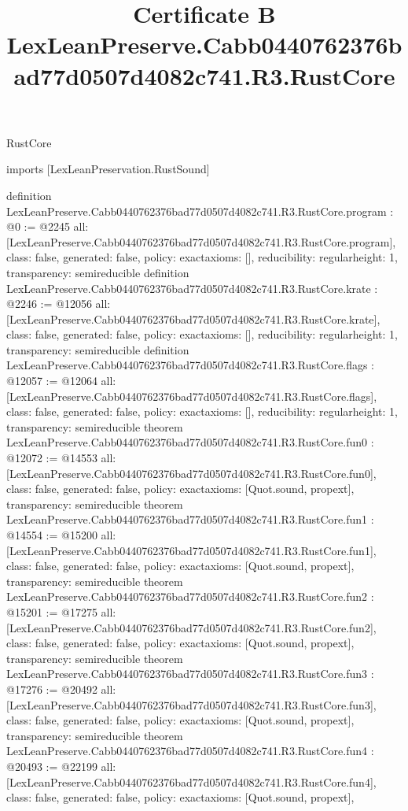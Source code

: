 \begin{lexlean}{RustCore}
\title{Certificate B LexLeanPreserve.Cabb0440762376bad77d0507d4082c741.R3.RustCore}
\begin{coremodule}
imports [LexLeanPreservation.RustSound]

definition LexLeanPreserve.Cabb0440762376bad77d0507d4082c741.R3.RustCore.program : @0 := @2245 {
  all: [LexLeanPreserve.Cabb0440762376bad77d0507d4082c741.R3.RustCore.program],
  class: false,
  generated: false,
  policy: exact{axioms: []},
  reducibility: regular{height: 1},
  transparency: semireducible
}
definition LexLeanPreserve.Cabb0440762376bad77d0507d4082c741.R3.RustCore.krate : @2246 := @12056 {
  all: [LexLeanPreserve.Cabb0440762376bad77d0507d4082c741.R3.RustCore.krate],
  class: false,
  generated: false,
  policy: exact{axioms: []},
  reducibility: regular{height: 1},
  transparency: semireducible
}
definition LexLeanPreserve.Cabb0440762376bad77d0507d4082c741.R3.RustCore.flags : @12057 := @12064 {
  all: [LexLeanPreserve.Cabb0440762376bad77d0507d4082c741.R3.RustCore.flags],
  class: false,
  generated: false,
  policy: exact{axioms: []},
  reducibility: regular{height: 1},
  transparency: semireducible
}
theorem LexLeanPreserve.Cabb0440762376bad77d0507d4082c741.R3.RustCore.fun0 : @12072 := @14553 {
  all: [LexLeanPreserve.Cabb0440762376bad77d0507d4082c741.R3.RustCore.fun0],
  class: false,
  generated: false,
  policy: exact{axioms: [Quot.sound, propext]},
  transparency: semireducible
}
theorem LexLeanPreserve.Cabb0440762376bad77d0507d4082c741.R3.RustCore.fun1 : @14554 := @15200 {
  all: [LexLeanPreserve.Cabb0440762376bad77d0507d4082c741.R3.RustCore.fun1],
  class: false,
  generated: false,
  policy: exact{axioms: [Quot.sound, propext]},
  transparency: semireducible
}
theorem LexLeanPreserve.Cabb0440762376bad77d0507d4082c741.R3.RustCore.fun2 : @15201 := @17275 {
  all: [LexLeanPreserve.Cabb0440762376bad77d0507d4082c741.R3.RustCore.fun2],
  class: false,
  generated: false,
  policy: exact{axioms: [Quot.sound, propext]},
  transparency: semireducible
}
theorem LexLeanPreserve.Cabb0440762376bad77d0507d4082c741.R3.RustCore.fun3 : @17276 := @20492 {
  all: [LexLeanPreserve.Cabb0440762376bad77d0507d4082c741.R3.RustCore.fun3],
  class: false,
  generated: false,
  policy: exact{axioms: [Quot.sound, propext]},
  transparency: semireducible
}
theorem LexLeanPreserve.Cabb0440762376bad77d0507d4082c741.R3.RustCore.fun4 : @20493 := @22199 {
  all: [LexLeanPreserve.Cabb0440762376bad77d0507d4082c741.R3.RustCore.fun4],
  class: false,
  generated: false,
  policy: exact{axioms: [Quot.sound, propext]},
}
\end{coremodule}
\end{lexlean}
